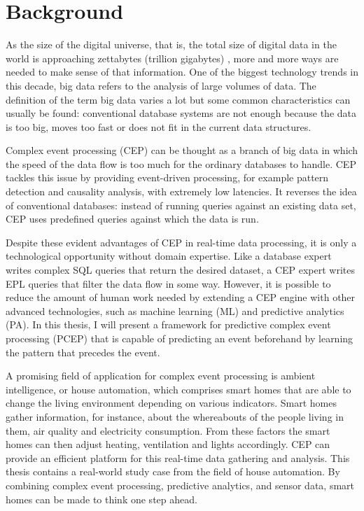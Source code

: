 \section{Background}
As the size of the digital universe, that is, the total size of digital data in the world is approaching zettabytes (trillion gigabytes) \cite{IDC},  more and more ways are needed to make sense of that information. One of the biggest technology trends in this decade, big data refers to the analysis of large volumes of data. The definition of the term big data varies a lot but some common characteristics can usually be found: conventional database systems are not enough because the data is too big, moves too fast or does not fit in the current data structures. \cite{Dumbill12}

Complex event processing (CEP) can be thought as a branch of big data in which the speed of the data flow is too much for the ordinary databases to handle. CEP tackles this issue by providing event-driven processing, for example pattern detection and causality analysis, with extremely low latencies. \cite{CEP10} It reverses the idea of conventional databases: instead of running queries against an existing data set, CEP uses predefined queries against which the data is run.

Despite these evident advantages of CEP in real-time data processing, it is only a technological opportunity without domain expertise. Like a database expert writes complex SQL queries that return the desired dataset, a CEP expert writes EPL queries that filter the data flow in some way. However, it is possible to reduce the amount of human work needed by extending a CEP engine with other advanced technologies, such as machine learning (ML) and predictive analytics (PA). \cite{Fulop12} In this thesis, I will present a framework for predictive complex event processing (PCEP) that is capable of predicting an event beforehand by learning the pattern that precedes the event.

A promising field of application for complex event processing is ambient intelligence, or house automation, which comprises smart homes that are able to change the living environment depending on various indicators. \cite{Augusto04} Smart homes gather information, for instance, about the whereabouts of the people living in them, air quality and electricity consumption. From these factors the smart homes can then adjust heating, ventilation and lights accordingly. CEP can provide an efficient platform for this real-time data gathering and analysis. This thesis contains a real-world study case from the field of house automation. By combining complex event processing, predictive analytics, and sensor data, smart homes can be made to think one step ahead.

